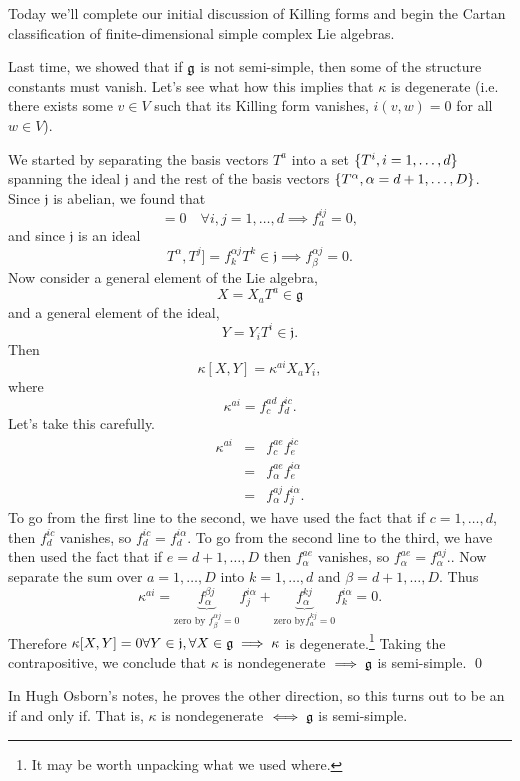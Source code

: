Today we'll complete our initial discussion of Killing forms and begin the Cartan classification of finite-dimensional simple complex Lie algebras.

Last time, we showed that if $\mathfrak{g}$ is not semi-simple, then some of the structure constants must vanish. Let's see what how this implies that $\kappa$ is degenerate (i.e. there exists some $v\in V$ such that its Killing form vanishes, $i(v,w)=0$ for all $w\in V$).

We started by separating the basis vectors $T^a$ into a set $\{T^i,i=1,\ldots,d\}$ spanning the ideal $\mathfrak{j}$ and the rest of the basis vectors $\{T^\alpha, \alpha=d+1,\ldots, D\}$. Since $\mathfrak{j}$ is abelian, we found that
\begin{equation}
[T^i, T^j]=0\quad \forall i,j=1,\ldots,d \implies f^{ij}_a=0,
\end{equation}
and since $\mathfrak{j}$ is an ideal
\begin{equation}
T^\alpha, T^j]=f^{\alpha j}_k T^k\in \mathfrak{j} \implies f^{\alpha j}_\beta=0.
\end{equation}
Now consider a general element of the Lie algebra, $$X=X_a T^a \in \mathfrak{g}$$ and a general element of the ideal,
$$Y=Y_i T^i \in \mathfrak{j}.$$
Then
$$\kappa[X,Y]=\kappa^{ai}X_a Y_i,$$
where
$$\kappa^{ai}=f^{ad}_c f^{ic}_d.$$
Let's take this carefully.
\begin{eqnarray*}
\kappa^{ai}&=&f^{ae}_c f^{ic}_e\\
&=&f^{ae}_\alpha f^{i\alpha}_e\\
&=&f^{aj}_\alpha f^{i\alpha}_j.
\end{eqnarray*}
To go from the first line to the second, we have used the fact that if $c=1,\ldots,d$, then $f^{ic}_d$ vanishes, so $f^{ic}_d=f^{i\alpha}_d$. To go from the second line to the third, we have then used the fact that if $e=d+1,\ldots,D$ then $f^{ae}_{\alpha}$ vanishes, so $f^{ae}_\alpha=f^{aj}_\alpha.$.
Now separate the sum over $a=1,\ldots,D$ into $k=1,\ldots,d$ and $\beta=d+1,\ldots,D$.
Thus
$$\kappa^{ai}=\underbrace{f^{\beta j}_\alpha}_{\text{zero by } f^{\alpha j}_\beta=0} f^{i\alpha}_j + \underbrace{f^{kj}_\alpha}_{\text{zero by}f^{kj}_a=0} f^{i\alpha}_k=0.$$
Therefore $\kappa[X,Y]=0 \forall Y\in \mathfrak{j},\forall X \in \mathfrak{g}\implies \kappa$ is degenerate.\footnote{It may be worth unpacking what we used where.} Taking the contrapositive, we conclude that $\kappa$ is nondegenerate $\implies \mathfrak{g}$ is semi-simple. \qed

In Hugh Osborn's notes, he proves the other direction, so this turns out to be an if and only if. That is, $\kappa$ is nondegenerate $\iff \mathfrak{g}$ is semi-simple.

